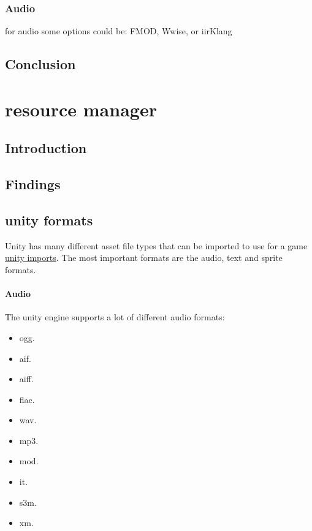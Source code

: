 \documentclass{projdoc}
\begin{document}
\subsubsection{Audio}

for audio some options could be: FMOD, Wwise, or iirKlang

\subsection{Conclusion}

\section{resource manager}

\subsection{Introduction}

\subsection{Findings}

\subsection{unity formats}
Unity has many different asset file types that can be imported to use for a game \href{https://docs.unity3d.com/Manual/BuiltInImporters.html}{unity imports}. The most important formats are the audio, text and sprite formats.

\paragraph{Audio}

The unity engine supports a lot of different audio formats:
\begin{itemize}
	\item ogg.
	\item aif.
	\item aiff.
	\item flac.
	\item wav.
	\item mp3.
	\item mod.
	\item it.
	\item s3m.
	\item xm.
\end{itemize}
\end{document}
